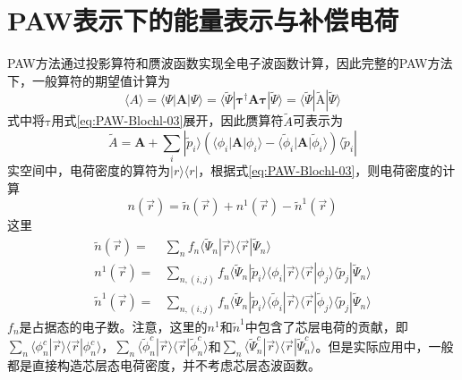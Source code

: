 \section{PAW表示下的能量表示与补偿电荷}
\textrm{PAW}方法通过投影算符和赝波函数实现全电子波函数计算，因此完整的\textrm{PAW}方法下，一般算符的期望值计算为
\begin{equation}
	\langle A \rangle=\langle\Psi|\mathbf{A}|\Psi\rangle=\langle\tilde\Psi|\mathbf{\tau}^{\dag}\mathbf{A}\mathbf{\tau}|\tilde\Psi\rangle=\langle\tilde\Psi|\tilde{\mathrm{A}}|\tilde\Psi\rangle
	\label{eq:PAW-Blochl-04}
\end{equation}
式中将$\mathrm{\tau}$用式\eqref{eq:PAW-Blochl-03}展开，因此赝算符$\tilde A$可表示为
\begin{equation}
	\tilde A=\mathbf{A}+\sum_i|\tilde p_i\rangle(\langle\phi_i|\mathbf{A}|\phi_i\rangle-\langle\tilde\phi_i|\mathbf{A}|\tilde\phi_i\rangle)\langle\tilde p_i|
	\label{eq:PAW-Blochl-05}
\end{equation}
实空间中，电荷密度的算符为$|r\rangle\langle r|$，根据式\eqref{eq:PAW-Blochl-03}，则电荷密度的计算
\begin{equation}
	n(\vec r)=\tilde n(\vec r)+n^1(\vec r)-\tilde n^1(\vec r)
	\label{eq:PAW-Blochl-07}
\end{equation}
这里
\begin{displaymath}
	\begin{aligned}
		\tilde n(\vec r)=&\sum_nf_n\langle\tilde\Psi_n|\vec r\rangle\langle\vec r|\tilde\Psi_n\rangle \\
n^1(\vec r)=&\sum_{n,(i,j)}f_n\langle\tilde\Psi_n|\tilde p_i\rangle\langle\phi_i|\vec r\rangle\langle\vec r|\phi_j\rangle\langle\tilde p_j|\tilde\Psi_n\rangle \\
\tilde n^1(\vec r)=&\sum_{n,(i,j)}f_n\langle\tilde\Psi_n|\tilde p_i\rangle\langle\tilde\phi_i|\vec r\rangle\langle\vec r|\tilde\phi_j\rangle\langle\tilde p_j|\tilde\Psi_n\rangle
	\end{aligned}
\end{displaymath}
$f_n$是占据态的电子数。注意，这里的$n^1$和$\tilde n^1$中包含了芯层电荷的贡献，即$\sum_n\langle\phi_n^c|\vec r\rangle\langle\vec r|\phi_n^c\rangle$，$\sum_n\langle\tilde\phi_n^c|\vec r\rangle\langle\vec r|\tilde\phi_n^c\rangle$和$\sum_n\langle\tilde\Psi_n^c|\vec r\rangle\langle\vec r|\tilde\Psi_n^c\rangle$。但是实际应用中，一般都是直接构造芯层态电荷密度，并不考虑芯层态波函数。

